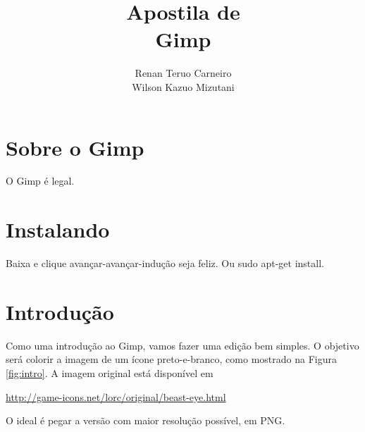 \documentclass[12pt,onecolumn]{article}
\begin{document}
\begin{titlepage}

    \title{
        \bf
        \LARGE Apostila de \\
        \Huge  Gimp
    }
    
    \author{Renan Teruo Carneiro \\ Wilson Kazuo Mizutani}
    
    \maketitle
    
    \thispagestyle{empty}
    
\end{titlepage}

\tableofcontents

\clearpage

\section{Sobre o Gimp}
  O Gimp é legal.

\section{Instalando}
  Baixa e clique avançar-avançar-indução seja feliz.
  Ou sudo apt-get install.

\clearpage
\section{Introdução}
  Como uma introdução ao Gimp, vamos fazer uma edição bem simples. O objetivo
  será colorir a imagem de um ícone preto-e-branco, como mostrado na Figura
  \ref{fig:intro}. A imagem original está disponível em
  
  \begin{center}
    \url{http://game-icons.net/lorc/original/beast-eye.html}      
  \end{center}
  
   O ideal é pegar a versão com maior resolução possível, em PNG.
\end{document}
